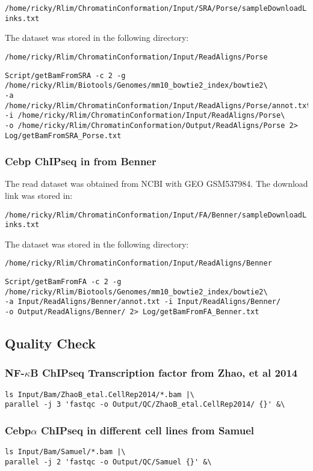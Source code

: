 \documentclass{article}\usepackage[]{graphicx}\usepackage[]{color}
\begin{document}
\verb|/home/ricky/Rlim/ChromatinConformation/Input/SRA/Porse/sampleDownloadLinks.txt|

The dataset was stored in the following directory:

\verb|/home/ricky/Rlim/ChromatinConformation/Input/ReadAligns/Porse|            

\begin{verbatim}
Script/getBamFromSRA -c 2 -g /home/ricky/Rlim/Biotools/Genomes/mm10_bowtie2_index/bowtie2\ 
-a /home/ricky/Rlim/ChromatinConformation/Input/ReadAligns/Porse/annot.txt 
-i /home/ricky/Rlim/ChromatinConformation/Input/ReadAligns/Porse\
-o /home/ricky/Rlim/ChromatinConformation/Output/ReadAligns/Porse 2> Log/getBamFromSRA_Porse.txt 
\end{verbatim}

\subsubsection{Cebp ChIPseq in from Benner}
The read dataset was obtained from NCBI with GEO GSM537984. 
The download link was stored in:

\verb|/home/ricky/Rlim/ChromatinConformation/Input/FA/Benner/sampleDownloadLinks.txt|

The dataset was stored in the following directory:

\verb|/home/ricky/Rlim/ChromatinConformation/Input/ReadAligns/Benner|            

\begin{verbatim}
Script/getBamFromFA -c 2 -g /home/ricky/Rlim/Biotools/Genomes/mm10_bowtie2_index/bowtie2\
-a Input/ReadAligns/Benner/annot.txt -i Input/ReadAligns/Benner/ 
-o Output/ReadAligns/Benner/ 2> Log/getBamFromFA_Benner.txt
\end{verbatim}


\subsection{Quality Check}
\subsubsection{NF-$\kappa$B ChIPseq Transcription factor from Zhao, et al 2014}
\begin{verbatim}
ls Input/Bam/ZhaoB_etal.CellRep2014/*.bam |\ 
parallel -j 3 'fastqc -o Output/QC/ZhaoB_etal.CellRep2014/ {}' &\
\end{verbatim}

\subsubsection{Cebp$\alpha$ ChIPseq in different cell lines from Samuel}
\begin{verbatim}
ls Input/Bam/Samuel/*.bam |\ 
parallel -j 2 'fastqc -o Output/QC/Samuel {}' &\
\end{verbatim}
\end{document}
